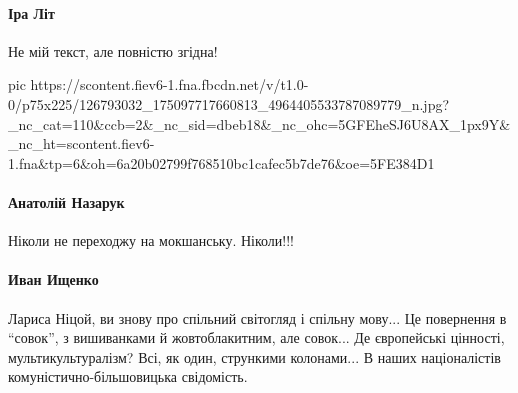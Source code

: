 \paragraph{Іра Літ}

Не мій текст, але повністю згідна!

\ifcmt
pic https://scontent.fiev6-1.fna.fbcdn.net/v/t1.0-0/p75x225/126793032_175097717660813_4964405533787089779_n.jpg?_nc_cat=110&ccb=2&_nc_sid=dbeb18&_nc_ohc=5GFEheSJ6U8AX_1px9Y&_nc_ht=scontent.fiev6-1.fna&tp=6&oh=6a20b02799f768510bc1cafec5b7de76&oe=5FE384D1
\fi

\paragraph{Анатолій Назарук}
Ніколи не переходжу на мокшанську. Ніколи!!!

\paragraph{Иван Ищенко}

Лариса Ніцой, ви знову про спільний світогляд і спільну мову... Це повернення в
\enquote{совок}, з вишиванками й жовтоблакитним, але совок... Де європейські
цінності, мультикультуралізм? Всі, як один, стрункими колонами... В наших
націоналістів комуністично-більшовицька свідомість.
